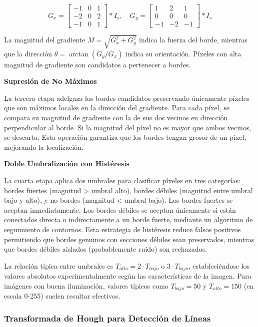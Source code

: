 \begin{equation}
G_x = \begin{bmatrix} -1 & 0 & 1 \\ -2 & 0 & 2 \\ -1 & 0 & 1 \end{bmatrix} \ast I_s, \quad G_y = \begin{bmatrix} 1 & 2 & 1 \\ 0 & 0 & 0 \\ -1 & -2 & -1 \end{bmatrix} \ast I_s
\end{equation}

La magnitud del gradiente $M = \sqrt{G_x^2 + G_y^2}$ indica la fuerza del borde, mientras que la dirección $\theta = \arctan(G_y/G_x)$ indica su orientación. Píxeles con alta magnitud de gradiente son candidatos a pertenecer a bordes.

\textbf{Supresión de No Máximos}

La tercera etapa adelgaza los bordes candidatos preservando únicamente píxeles que son máximos locales en la dirección del gradiente. Para cada píxel, se compara su magnitud de gradiente con la de sus dos vecinos en dirección perpendicular al borde. Si la magnitud del píxel no es mayor que ambos vecinos, se descarta. Esta operación garantiza que los bordes tengan grosor de un píxel, mejorando la localización.

\textbf{Doble Umbralización con Histéresis}

La cuarta etapa aplica dos umbrales para clasificar píxeles en tres categorías: bordes fuertes (magnitud > umbral alto), bordes débiles (magnitud entre umbral bajo y alto), y no bordes (magnitud < umbral bajo). Los bordes fuertes se aceptan inmediatamente. Los bordes débiles se aceptan únicamente si están conectados directa o indirectamente a un borde fuerte, mediante un algoritmo de seguimiento de contornos. Esta estrategia de histéresis reduce falsos positivos permitiendo que bordes genuinos con secciones débiles sean preservados, mientras que bordes débiles aislados (probablemente ruido) son rechazados.

La relación típica entre umbrales es $T_{alto} = 2 \cdot T_{bajo}$ o $3 \cdot T_{bajo}$, estableciéndose los valores absolutos experimentalmente según las características de la imagen. Para imágenes con buena iluminación, valores típicos como $T_{bajo} = 50$ y $T_{alto} = 150$ (en escala 0-255) suelen resultar efectivos.

\subsubsection{Transformada de Hough para Detección de Líneas}

